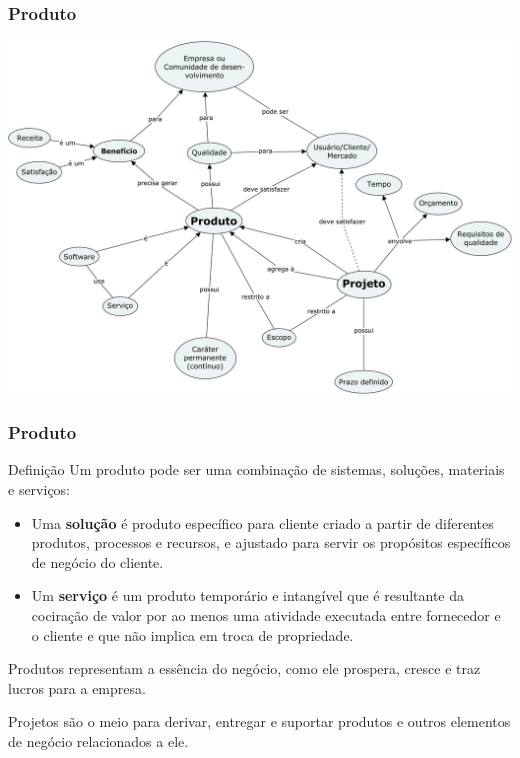 \begin{frame}[parent={ie:agenda}, hasnext=false, hasprev=false]
	\frametitle{Produto}

	\begin{center}
		\includegraphics[width=\textwidth]{product}
	\end{center}
\end{frame}


\begin{frame}[parent={ie:agenda}, hasnext=false, hasprev=false]
	\frametitle{Produto}
	
	\begin{block:concept}{Definição}
		Um produto pode ser uma combinação de sistemas, soluções, materiais
		e serviços:
	
		\begin{itemize}
			\item Uma \textbf{solução} é produto específico para cliente
			criado a partir de diferentes produtos, processos e recursos,
			e ajustado para servir os propósitos específicos
			de negócio do cliente.
			
			\item Um \textbf{serviço} é um produto temporário e intangível que é
			resultante da cociração de valor por ao menos uma atividade
			executada entre fornecedor e o cliente e que não implica em
			troca de propriedade.
		\end{itemize}
	\end{block:concept}
		
	\begin{block:fact}{}
		Produtos representam a essência do negócio, como ele prospera,
		cresce e traz lucros para a empresa.
		
		Projetos são o meio para derivar, entregar e suportar produtos
		e outros elementos de negócio relacionados a ele.
	\end{block:fact}
\end{frame}



